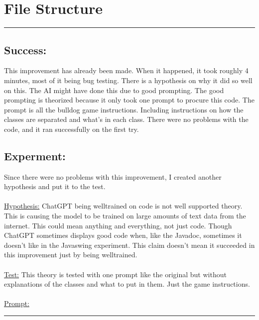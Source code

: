 \documentclass[a4paper,11pt]{article}
\begin{document}
\section*{File Structure}
\hrule
\vspace{13pt} %
\subsection*{Success:}
This improvement has already been made. When it happened, it took roughly 4 minutes, most of it being bug testing. There is a hypothesis on why it did so well on this. The AI might have done this due to good prompting. The good prompting is theorized because it only took one prompt to procure this code. The prompt is all the bulldog game instructions. Including instructions on how the classes are separated and what’s in each class. There were no problems with the code, and it ran successfully on the first try.
\subsection*{Experment:}
Since there were no problems with this improvement, I created another hypothesis and put it to the test. \\\\
\underline{Hypothesis:} ChatGPT being well\-trained on code is not well supported theory. This is causing the model to be trained on large amounts of text data from the internet. This could mean anything and everything, not just code. Though ChatGPT sometimes displays good code when, like the Javadoc, sometimes it doesn't like in the Javaswing experiment. This claim doesn't mean it succeeded in this improvement just by being well\-trained. \\\\
\underline{Test:} This theory is tested with one prompt like the original but without explanations of the classes and what to put in them. Just the game instructions. \\\\
\noindent
\underline{Prompt:} \\
\hrule
\vspace{2pt} %
\end{document}
